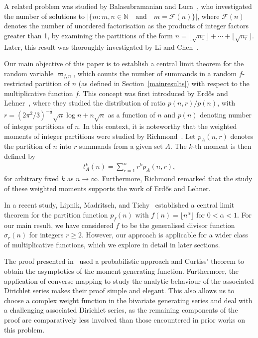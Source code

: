 \documentclass[12pt, oneside,reqno]{amsart}
\numberwithin{equation}{section}
\begin{document}

A related problem was studied by Balasubramanian and Luca~\cite{baluluca}, who investigated the number of solutions to $|\{m: m,n\in\mathbb{N}\quad\text{and}\quad m=\mathcal{F}(n)\}|$, where $\mathcal{F}(n)$ denotes the number of unordered factorisation as the products of integer factors greater than 1, by examining the partitions of the form $n=\lfloor{\sqrt{n_1}}\rfloor+\cdots+\lfloor{\sqrt{n_r}}\rfloor$. Later, this result was thoroughly investigated by Li and Chen~\cite{lichen}.

\medskip

Our main objective of this paper is to establish a central limit theorem for the random variable $\varpi_{f,n}$, which counts the number of summands in a random $f$-restricted partition of $n$ (as defined in Section~\ref{mainresults}) with respect to the multiplicative function $f$. This concept was first introduced by Erd\H{o}s and Lehner~\cite{erdoslehner}, where they studied the distribution of ratio $p(n,r)/p(n)$, with $r=(2\pi^2/3)^{-\tfrac{1}{2}}\sqrt{n}\log n+n\sqrt{n}$ as a function of $n$ and $p(n)$ denoting number of integer partitions of $n$. In this context, it is noteworthy that the weighted moments of integer partitions were studied by Richmond~\cite{richmond1,richmond2}. Let $p_{A}(n,r)$ denotes the partition of $n$ into $r$ summands from a given set $A$. The $k$-th moment is then defined by
\begin{align}\label{weightedmoments}
t^k_A(n)
=\sum_{r=1}^{n}r^kp_A(n,r),
\end{align}
for arbitrary fixed $k$ as $n\to\infty$. Furthermore, Richmond remarked that the study of these weighted moments supports the work of Erd\H{o}s and Lehner.



\medskip

In a recent study, Lipnik, Madritsch, and Tichy~\cite{lipniketal} established a central limit theorem for the partition function $p_f(n)$ with $f(n)=\lfloor{n^{\alpha}}\rfloor$ for $0<\alpha<1$. For our main result, we have considered $f$ to be the generalised divisor function $\sigma_r(n)$ for integers $r\geq 2$.
However, our approach is applicable for a wider class of multiplicative functions, which we explore in detail in later sections.  

The proof presented in~\cite{lipniketal} used a probabilistic approach and Curtiss' theorem to obtain the asymptotics of the moment generating function. Furthermore, the application of converse mapping to study the analytic behaviour of the associated Dirichlet series makes their proof simple and elegant. This also allows us to choose a complex weight function in the bivariate generating series and deal with a challenging associated Dirichlet series, as the remaining components of the proof are comparatively less involved than those encountered in prior works on this problem.
\end{document}
